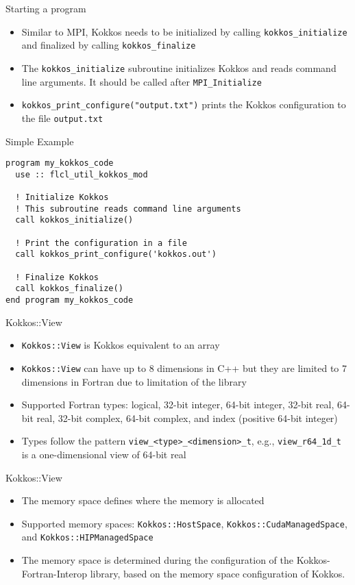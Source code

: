 \begin{frame}{Starting a program}
  \begin{itemize}
    \item Similar to MPI, Kokkos needs to be initialized by calling
      \texttt{kokkos\_initialize} and finalized by calling \texttt{kokkos\_finalize}
    \item The \texttt{kokkos\_initialize} subroutine initializes Kokkos and
      reads command line arguments. It should be called after
      \texttt{MPI\_Initialize}
    \item \texttt{kokkos\_print\_configure("output.txt")} prints the
      Kokkos configuration to the file \texttt{output.txt}
  \end{itemize}
\end{frame}

\begin{frame}[containsverbatim]{Simple Example}
  \begin{verbatim}
program my_kokkos_code
  use :: flcl_util_kokkos_mod

  ! Initialize Kokkos
  ! This subroutine reads command line arguments
  call kokkos_initialize()

  ! Print the configuration in a file
  call kokkos_print_configure('kokkos.out')

  ! Finalize Kokkos
  call kokkos_finalize()
end program my_kokkos_code
  \end{verbatim}
\end{frame}

\begin{frame}{Kokkos::View}
  \begin{itemize}
    \item \texttt{Kokkos::View} is Kokkos equivalent to an array
    \item \texttt{Kokkos::View} can have up to 8 dimensions in C++ but they are
      limited to 7 dimensions in Fortran due to limitation of the library
    \item Supported Fortran types: logical, 32-bit integer, 64-bit
      integer, 32-bit real, 64-bit real, 32-bit complex, 64-bit complex, and
      index (positive 64-bit integer)
    \item Types follow the pattern \texttt{view\_<type>\_<dimension>\_t}, e.g.,
      \texttt{view\_r64\_1d\_t} is a one-dimensional view of 64-bit real
  \end{itemize}
\end{frame}

\begin{frame}{Kokkos::View}
  \begin{itemize}
    \item The memory space defines where the memory is allocated
    \item Supported memory spaces: \texttt{Kokkos::HostSpace},
      \texttt{Kokkos::CudaManagedSpace}, and \texttt{Kokkos::HIPManagedSpace}
    \item The memory space is determined during the configuration of the
      Kokkos-Fortran-Interop library, based on the memory space
      configuration of Kokkos.
  \end{itemize}
\end{frame}

